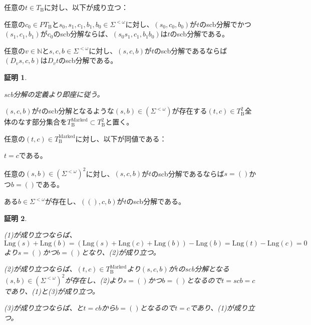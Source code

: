 \documentclass[dvipdfmx,uplatex]{jsarticle}
\theoremstyle{customnonumberbreakfortheorem}
\theoremstyle{customnonumberbreakforproof}
\newtheorem{hideableproof}{証明}
\begin{document}
\begin{proposition}[scb分解の合成則]\label{scb分解の合成則}
	任意の\(t \in T_{\textrm{B}}\)に対し、以下が成り立つ：
	\begin{penumerate}
		\item 任意の\(c_0 \in PT_{\textrm{B}}\)と\(s_0,s_1,c_1,b_1,b_0 \in \Sigma^{< \omega}\)に対し、\((s_0,c_0,b_0)\)が\(t\)のscb分解でかつ\((s_1,c_1,b_1)\)が\(c_0\)のscb分解ならば、\((s_0 s_1,c_1,b_1 b_0)\)は\(t\)のscb分解である。
		\item 任意の\(v \in \mathbb{N}\)と\(s,c,b \in \Sigma^{< \omega}\)に対し、\((s,c,b)\)が\(t\)のscb分解であるならば\((D_v s,c,b)\)は\(D_v t\)のscb分解である。
	\end{penumerate}
\end{proposition}

\begin{hideableproof}
	\begin{indented}
		\item scb分解の定義より即座に従う。
	\end{indented}
\end{hideableproof}

\((s,c,b)\)が\(t\)のscb分解となるような\((s,b) \in (\Sigma^{< \omega})\)が存在する\((t,c) \in T_{\textrm{B}}^2\)全体のなす部分集合を\(T_{\textrm{B}}^{\textrm{Marked}} \subset T_{\textrm{B}}^2\)と置く。

\begin{proposition}[scb分解の自明性の判定条件]\label{scb分解の自明性の判定条件}
	任意の\((t,c) \in T_{\textrm{B}}^{\textrm{Marked}}\)に対し、以下が同値である：
	\begin{penumerate}
		\item \(t = c\)である。
		\item 任意の\((s,b) \in (\Sigma^{< \omega})^2\)に対し、\((s,c,b)\)が\(t\)のscb分解であるならば\(s = ()\)かつ\(b = ()\)である。
		\item ある\(b \in \Sigma^{< \omega}\)が存在し、\(((),c,b)\)が\(t\)のscb分解である。
	\end{penumerate}
\end{proposition}

\begin{hideableproof}
	\begin{indented}
		\item (1)が成り立つならば、\(\textrm{Lng}(s) + \textrm{Lng}(b) = (\textrm{Lng}(s) + \textrm{Lng}(c) + \textrm{Lng}(b)) - \textrm{Lng}(b) = \textrm{Lng}(t) - \textrm{Lng}(c) = 0\)より\(s = ()\)かつ\(b = ()\)となり、(2)が成り立つ。
		\item (2)が成り立つならば、\((t,c) \in T_{\textrm{B}}^{\textrm{Marked}}\)より\((s,c,b)\)が\(t\)のscb分解となる\((s,b) \in (\Sigma^{< \omega})^2\)が存在し、(2)より\(s = ()\)かつ\(b = ()\)となるので\(t = scb = c\)であり、(1)と(3)が成り立つ。
		\item (3)が成り立つならば、と\(t = cb\)から\(b = ()\)となるので\(t = c\)であり、(1)が成り立つ。
	\end{indented}
\end{hideableproof}
\end{document}
